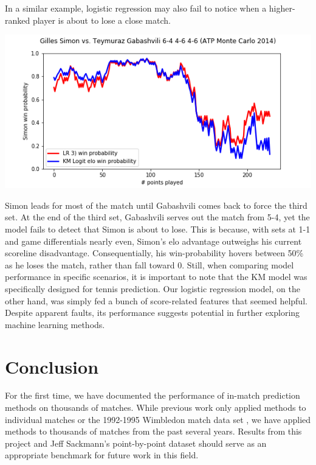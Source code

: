 \documentclass[chapterprefix=false]{report}
\begin{document}
In a similar example, logistic regression may also fail to notice when a higher-ranked player is about to lose a close match.

\includegraphics[scale=.7]{simon_gabashvili}

Simon leads for most of the match until Gabashvili comes back to force the third set. At the end of the third set, Gabashvili serves out the match from 5-4, yet the model fails to detect that Simon is about to lose. This is because, with sets at 1-1 and game differentials nearly even, Simon's elo advantage outweighs his current scoreline disadvantage. Consequentially, his win-probability hovers between 50\% as he loses the match, rather than fall toward 0. Still, when comparing model performance in specific scenarios, it is important to note that the KM model was specifically designed for tennis prediction. Our logistic regression model, on the other hand, was simply fed a bunch of score-related features that seemed helpful. Despite apparent faults, its performance suggests potential in further exploring machine learning methods.



\chapter{Conclusion}

For the first time, we have documented the performance of in-match prediction methods on thousands of matches. While previous work only applied methods to individual matches or the 1992-1995 Wimbledon match data set \cite{KlaassenandMagnus2003}, we have applied methods to thousands of matches from the past several years. Results from this project and Jeff Sackmann's point-by-point dataset should serve as an appropriate benchmark for future work in this field.

\end{document}
